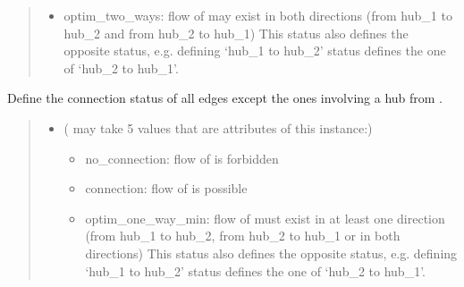 \documentclass[letterpaper,10pt,english]{sphinxmanual}
\begin{document}
\begin{fulllineitems}
\begin{fulllineitems}
\begin{quote}
\begin{description}
\begin{itemize}
\begin{itemize}
\item {} 
\sphinxAtStartPar
optim\_two\_ways: flow of  may exist in both directions
(from hub\_1 to hub\_2 and from hub\_2 to hub\_1)
This status also defines the opposite status, e.g. defining ‘hub\_1 to hub\_2’ status defines the one of ‘hub\_2 to hub\_1’.

\end{itemize}


\end{itemize}

\end{description}\end{quote}

\end{fulllineitems}


\begin{fulllineitems}
\label{\detokenize{generated/tamos.network.NonThermalNetwork:tamos.network.NonThermalNetwork.set_status}}
\pysigstartsignatures
{}
\pysigstopsignatures
\sphinxAtStartPar
Define the connection status of all edges except the ones involving a hub from .
\begin{quote}\begin{description}
\begin{itemize}
\item {} 
\sphinxAtStartPar
{} ( may take 5 values that are attributes of this instance:) \textendash{} \begin{itemize}
\item {} 
\sphinxAtStartPar
no\_connection: flow of  is forbidden

\item {} 
\sphinxAtStartPar
connection: flow of  is possible

\item {} 
\sphinxAtStartPar
optim\_one\_way\_min: flow of  must exist in at least one direction
(from hub\_1 to hub\_2, from hub\_2 to hub\_1 or in both directions)
This status also defines the opposite status, e.g. defining ‘hub\_1 to hub\_2’ status defines the one of ‘hub\_2 to hub\_1’.


\end{itemize}
\end{itemize}
\end{description}
\end{quote}
\end{fulllineitems}
\end{fulllineitems}
\end{document}
